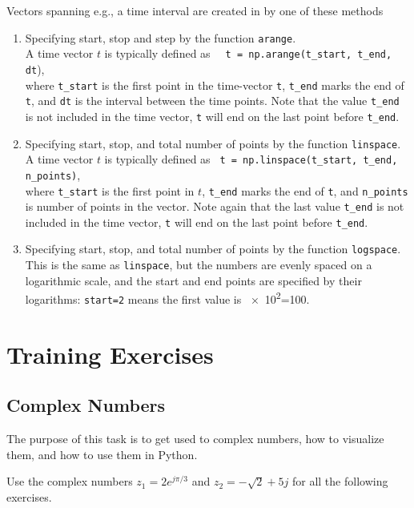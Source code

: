 Vectors spanning e.g., a time interval are created in \numpy by one of these methods

\begin{enumerate}[1)]
	\item Specifying start, stop and step by the function \texttt{arange}. \\ 
	 A time vector $t$ is  typically defined as 
	 \verb|  t = np.arange(t_start, t_end, dt|), \\
	 where \verb|t_start| is the first point in the time-vector \verb|t|, \verb|t_end| marks the end of \verb|t|, and \verb|dt| is the interval between the time points. Note that the value \verb|t_end| is not included in the time vector, \verb|t| will end on the last point before \verb|t_end|.
	 
	\item Specifying start, stop, and total number of points by the function \texttt{linspace}. \\
	A time vector $t$ is typically defined as \verb| t = np.linspace(t_start, t_end, n_points)|, \\
	where \verb|t_start| is the first point in $t$, \verb|t_end| marks the end of \verb|t|, and \verb|n_points| is number of points in the vector. 
	Note again that the last value \verb|t_end| is not included in the time vector, \verb|t| will end on the last point before \verb|t_end|.

	\item Specifying start, stop, and total number of points by the function \texttt{logspace}. \\ 
	This is the same as \verb|linspace|, but the numbers are evenly spaced on a logarithmic scale, and the start and end points are specified by their logarithms: \verb|start=2| means the first value is \num{e2}=\num{100}.
\end{enumerate}
	


\section{Training Exercises}

\subsection{Complex Numbers}
The purpose of this task is to get used to complex numbers, how to visualize them, and how to use them in Python.

Use the complex numbers $z_1 = 2e^{j\pi/3}$ and $z_2= -\sqrt{2} + 5j$ for all the following exercises.

